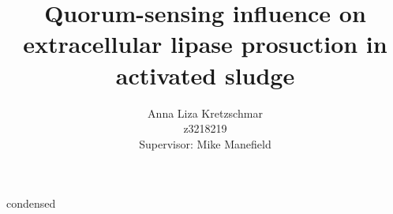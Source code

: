 \documentclass[11pt]{article}
\title{\textbf{Quorum-sensing influence on extracellular lipase prosuction in activated sludge}}
\author{Anna Liza Kretzschmar\\
        z3218219\\
        Supervisor: Mike Manefield}
\date{}
\begin{document}
condensed
\end{document}
